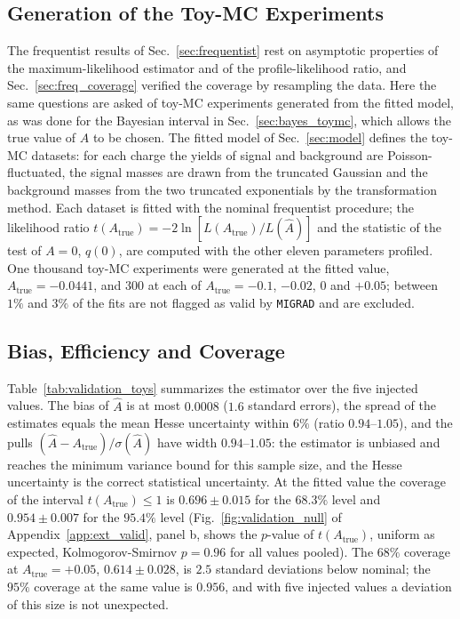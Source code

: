 \subsection{Generation of the Toy-MC Experiments}
The frequentist results of Sec.~\ref{sec:frequentist} rest on asymptotic properties of the maximum-likelihood estimator and of the profile-likelihood ratio, and Sec.~\ref{sec:freq_coverage} verified the coverage by resampling the data. Here the same questions are asked of toy-MC experiments generated from the fitted model, as was done for the Bayesian interval in Sec.~\ref{sec:bayes_toymc}, which allows the true value of $A$ to be chosen. The fitted model of Sec.~\ref{sec:model} defines the toy-MC datasets: for each charge the yields of signal and background are Poisson-fluctuated, the signal masses are drawn from the truncated Gaussian and the background masses from the two truncated exponentials by the transformation method. Each dataset is fitted with the nominal frequentist procedure; the likelihood ratio $t(A_{\mathrm{true}})=-2\ln[L(A_{\mathrm{true}})/L(\hat A)]$ and the statistic of the test of $A=0$, $q(0)$, are computed with the other eleven parameters profiled. One thousand toy-MC experiments were generated at the fitted value, $A_{\mathrm{true}}=-0.0441$, and $300$ at each of $A_{\mathrm{true}}=-0.1$, $-0.02$, $0$ and $+0.05$; between $1\%$ and $3\%$ of the fits are not flagged as valid by \texttt{MIGRAD} and are excluded.

\subsection{Bias, Efficiency and Coverage}
Table~\ref{tab:validation_toys} summarizes the estimator over the five injected values. The bias of $\hat A$ is at most $0.0008$ ($1.6$ standard errors), the spread of the estimates equals the mean Hesse uncertainty within $6\%$ (ratio $0.94$--$1.05$), and the pulls $(\hat A-A_{\mathrm{true}})/\sigma(\hat A)$ have width $0.94$--$1.05$: the estimator is unbiased and reaches the minimum variance bound for this sample size, and the Hesse uncertainty is the correct statistical uncertainty. At the fitted value the coverage of the interval $t(A_{\mathrm{true}})\leq1$ is $0.696\pm0.015$ for the $68.3\%$ level and $0.954\pm0.007$ for the $95.4\%$ level (Fig.~\ref{fig:validation_null} of Appendix~\ref{app:ext_valid}, panel b, shows the $p$-value of $t(A_{\mathrm{true}})$, uniform as expected, Kolmogorov-Smirnov $p=0.96$ for all values pooled). The $68\%$ coverage at $A_{\mathrm{true}}=+0.05$, $0.614\pm0.028$, is $2.5$ standard deviations below nominal; the $95\%$ coverage at the same value is $0.956$, and with five injected values a deviation of this size is not unexpected.

